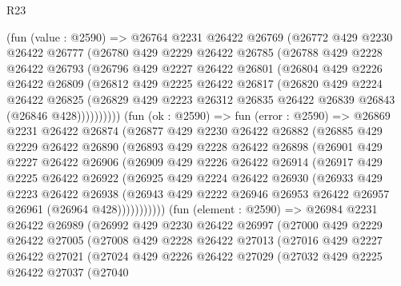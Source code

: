 \begin{lexlean}{R23}
\begin{coremodule}
    (fun (value : @2590) =>
    @26764
      @2231
      @26422
      @26769
      (@26772
        @429
        @2230
        @26422
        @26777
        (@26780
          @429
          @2229
          @26422
          @26785
          (@26788
            @429
            @2228
            @26422
            @26793
            (@26796
              @429
              @2227
              @26422
              @26801
              (@26804
                @429
                @2226
                @26422
                @26809
                (@26812
                  @429
                  @2225
                  @26422
                  @26817
                  (@26820
                    @429
                    @2224
                    @26422
                    @26825
                    (@26829 @429 @2223 @26312 @26835 @26422 @26839 @26843 (@26846 @428))))))))))
    (fun (ok : @2590) =>
    fun (error : @2590) =>
    @26869
      @2231
      @26422
      @26874
      (@26877
        @429
        @2230
        @26422
        @26882
        (@26885
          @429
          @2229
          @26422
          @26890
          (@26893
            @429
            @2228
            @26422
            @26898
            (@26901
              @429
              @2227
              @26422
              @26906
              (@26909
                @429
                @2226
                @26422
                @26914
                (@26917
                  @429
                  @2225
                  @26422
                  @26922
                  (@26925
                    @429
                    @2224
                    @26422
                    @26930
                    (@26933
                      @429
                      @2223
                      @26422
                      @26938
                      (@26943 @429 @2222 @26946 @26953 @26422 @26957 @26961 (@26964 @428)))))))))))
    (fun (element : @2590) =>
    @26984
      @2231
      @26422
      @26989
      (@26992
        @429
        @2230
        @26422
        @26997
        (@27000
          @429
          @2229
          @26422
          @27005
          (@27008
            @429
            @2228
            @26422
            @27013
            (@27016
              @429
              @2227
              @26422
              @27021
              (@27024
                @429
                @2226
                @26422
                @27029
                (@27032
                  @429
                  @2225
                  @26422
                  @27037
                  (@27040

\end{coremodule}
\end{lexlean}
